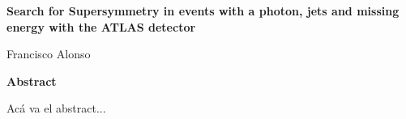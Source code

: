 \thispagestyle{plain}
\begin{center}
  \Large
  \textbf{Search for Supersymmetry in events with a photon, jets and
    missing energy with the ATLAS detector}

  \vspace{0.4cm}
  \large

  \vspace{0.4cm}
  Francisco Alonso

  \vspace{2cm}
  \textbf{Abstract}
\end{center}

Acá va el abstract...
